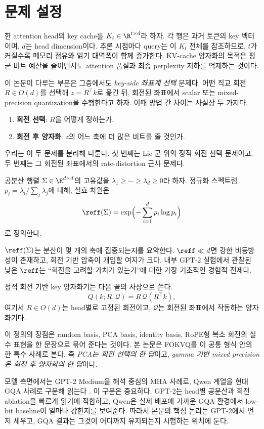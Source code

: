 \section{문제 설정}

한 attention head의 key cache를 $K_t \in \R^{t \times d}$라 하자. 각 행은 과거 토큰의 key 벡터이며, $d$는 head dimension이다. 추론 시점마다 query는 이 $K_t$ 전체를 참조하므로, $t$가 커질수록 메모리 점유와 읽기 대역폭이 함께 증가한다. KV-cache 양자화의 목적은 평균 비트 예산을 줄이면서도 attention 품질과 최종 perplexity 저하를 억제하는 것이다.

이 논문이 다루는 부분은 그중에서도 \emph{key-side 좌표계 선택} 문제다. 어떤 직교 회전 $R \in O(d)$를 선택해 $z = R^\top k$로 옮긴 뒤, 회전된 좌표에서 scalar 또는 mixed-precision quantization을 수행한다고 하자. 이때 방법 간 차이는 사실상 두 가지다.

\begin{enumerate}
\item \textbf{회전 선택}: $R$을 어떻게 정하는가.
\item \textbf{회전 후 양자화}: $z$의 어느 축에 더 많은 비트를 줄 것인가.
\end{enumerate}

우리는 이 두 문제를 분리해 다룬다. 첫 번째는 Lie 군 위의 정적 회전 선택 문제이고, 두 번째는 그 회전된 좌표에서의 rate-distortion 근사 문제다.

\begin{definition}[실효 차원]
공분산 행렬 $\Sigma \in \R^{d \times d}$의 고유값을 $\lambda_1 \ge \cdots \ge \lambda_d \ge 0$라 하자. 정규화 스펙트럼 $p_i = \lambda_i / \sum_j \lambda_j$에 대해, 실효 차원은
\[
\reff(\Sigma)=\exp\Bigl(-\sum_{i=1}^{d} p_i \log p_i\Bigr)
\]
로 정의한다.
\end{definition}

$\reff(\Sigma)$는 분산이 몇 개의 축에 집중되는지를 요약한다. $\reff \ll d$면 강한 비등방성이 존재하고, 회전 기반 압축이 개입할 여지가 크다. 내부 GPT-2 실험에서 관찰된 낮은 $\reff$는 ``회전을 고려할 가치가 있는가''에 대한 가장 기초적인 경험적 전제다.

\begin{definition}[정적 회전 기반 KV 양자화]
정적 회전 기반 key 양자화기는 다음 꼴의 사상으로 쓴다.
\[
Q(k;R,\mathcal{Q}) = R\, \mathcal{Q}(R^\top k),
\]
여기서 $R \in O(d)$는 head별로 고정된 회전이고, $\mathcal{Q}$는 회전된 좌표에서 작동하는 양자화기다.
\end{definition}

이 정의의 장점은 random basis, PCA basis, identity basis, RoPE형 복소 회전의 실수 표현을 한 문장으로 묶어 준다는 것이다. 본 논문은 FOKVQ를 이 공통 형식 안의 한 특수 사례로 본다. 즉 \emph{PCA는 회전 선택의 한 답}이고, \emph{gamma 기반 mixed precision은 회전 후 양자화의 한 답}이다.

모델 측면에서는 GPT-2 Medium을 해석 중심의 MHA 사례로, Qwen 계열을 현대 GQA 사례로 구분해 읽는다 \citep{radford2019language,qwen2024qwen25}. 이 구분은 중요하다. GPT-2는 head별 공분산과 회전 ablation을 빠르게 읽기에 적합하고, Qwen은 실제 배포에 가까운 GQA 환경에서 low-bit baseline이 얼마나 강한지를 보여준다. 따라서 본문의 핵심 논리는 GPT-2에서 먼저 세우고, GQA 결과는 그것이 어디까지 유지되는지 시험하는 위치에 둔다.
